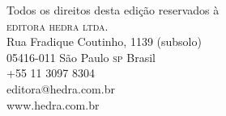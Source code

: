 \documentclass{livrodaclasse}
\begin{document}
Todos os direitos desta edição reservados à\\
\textsc{editora hedra ltda.}\\
Rua Fradique Coutinho, 1139 (subsolo)\\
05416-011 São Paulo \textsc{sp} Brasil\\
+55 11 3097 8304\\
editora@hedra.com.br\\
www.hedra.com.br
\endgroup
\clearpage

\clearpage

\renewcommand{\contentsname}{Sumário}
\tableofcontents*

\cleardoublepage


\introducao

\cleardoublepage

\part{\titulo}

\openany

\cleardoublepage

\texto

\colofao
\end{document}

